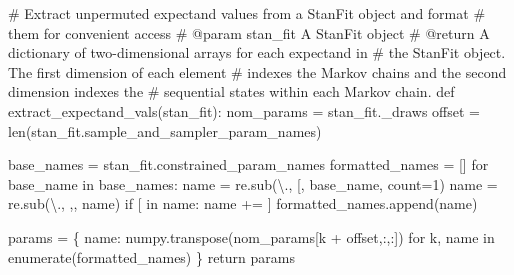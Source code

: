 \documentclass[
  letterpaper,
  DIV=11,
  numbers=noendperiod]{scrartcl}
\newenvironment{Shaded}{\begin{snugshade}}{\end{snugshade}}
\newcommand{\BuiltInTok}[1]{\textcolor[rgb]{0.00,0.23,0.31}{#1}}
\newcommand{\CommentTok}[1]{\textcolor[rgb]{0.37,0.37,0.37}{#1}}
\newcommand{\ControlFlowTok}[1]{\textcolor[rgb]{0.00,0.23,0.31}{#1}}
\newcommand{\DecValTok}[1]{\textcolor[rgb]{0.68,0.00,0.00}{#1}}
\newcommand{\KeywordTok}[1]{\textcolor[rgb]{0.00,0.23,0.31}{#1}}
\newcommand{\NormalTok}[1]{\textcolor[rgb]{0.00,0.23,0.31}{#1}}
\newcommand{\OperatorTok}[1]{\textcolor[rgb]{0.37,0.37,0.37}{#1}}
\newcommand{\StringTok}[1]{\textcolor[rgb]{0.13,0.47,0.30}{#1}}
\begin{document}
\begin{Shaded}
\begin{Highlighting}[]
\CommentTok{\# Extract unpermuted expectand values from a StanFit object and format}
\CommentTok{\# them for convenient access}
\CommentTok{\# @param stan\_fit A StanFit object}
\CommentTok{\# @return A dictionary of two{-}dimensional arrays for each expectand in}
\CommentTok{\#         the StanFit object.  The first dimension of each element}
\CommentTok{\#         indexes the Markov chains and the second dimension indexes the}
\CommentTok{\#         sequential states within each Markov chain.}
\KeywordTok{def}\NormalTok{ extract\_expectand\_vals(stan\_fit):}
\NormalTok{  nom\_params }\OperatorTok{=}\NormalTok{ stan\_fit.\_draws}
\NormalTok{  offset }\OperatorTok{=} \BuiltInTok{len}\NormalTok{(stan\_fit.sample\_and\_sampler\_param\_names)}
  
\NormalTok{  base\_names }\OperatorTok{=}\NormalTok{ stan\_fit.constrained\_param\_names}
\NormalTok{  formatted\_names }\OperatorTok{=}\NormalTok{ []}
  \ControlFlowTok{for}\NormalTok{ base\_name }\KeywordTok{in}\NormalTok{ base\_names:}
\NormalTok{    name }\OperatorTok{=}\NormalTok{ re.sub(}\StringTok{\textquotesingle{}\textbackslash{}.\textquotesingle{}}\NormalTok{, }\StringTok{\textquotesingle{}[\textquotesingle{}}\NormalTok{, base\_name, count}\OperatorTok{=}\DecValTok{1}\NormalTok{)}
\NormalTok{    name }\OperatorTok{=}\NormalTok{ re.sub(}\StringTok{\textquotesingle{}\textbackslash{}.\textquotesingle{}}\NormalTok{, }\StringTok{\textquotesingle{},\textquotesingle{}}\NormalTok{, name)}
    \ControlFlowTok{if} \StringTok{\textquotesingle{}[\textquotesingle{}} \KeywordTok{in}\NormalTok{ name:}
\NormalTok{      name }\OperatorTok{+=} \StringTok{\textquotesingle{}]\textquotesingle{}}
\NormalTok{    formatted\_names.append(name)}

\NormalTok{  params }\OperatorTok{=}\NormalTok{ \{ name: numpy.transpose(nom\_params[k }\OperatorTok{+}\NormalTok{ offset,:,:])}
             \ControlFlowTok{for}\NormalTok{ k, name }\KeywordTok{in} \BuiltInTok{enumerate}\NormalTok{(formatted\_names) \}}
  \ControlFlowTok{return}\NormalTok{ params}
\end{Highlighting}
\end{Shaded}
\end{document}
